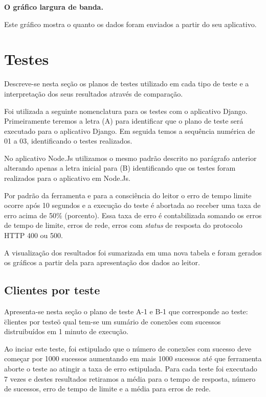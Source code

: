   \textbf{O gráfico largura de banda.}
  
  Este gráfico mostra o quanto os dados foram enviados a partir do seu aplicativo.


\section{Testes}

  Descreve-se nesta seção os planos de testes utilizado em cada tipo de teste e a interpretação dos seus resultados
  através de comparação.
  
  Foi utilizada a seguinte nomenclatura para os testes com o aplicativo Django. Primeiramente teremos a letra (A) para identificar
  que o plano de teste será executado para o aplicativo Django. Em seguida temos a sequência numérica de 01 a 03, 
  identificando o testes realizados. 
  
  No aplicativo Node.Js utilizamos o mesmo padrão descrito no parágrafo anterior alterando apenas a letra inicial para (B) identificando
  que os testes foram realizados para o aplicativo em Node.Js.
  
  Por padrão da ferramenta e para a consciência do leitor o erro de tempo limite ocorre após 10 segundos e a execução do teste é abortada
  ao receber uma taxa de erro acima de 50\% (porcento). Essa taxa de erro é contabilizada somando os erros de tempo de limite, erros de 
  rede, erros com \textit{status} de resposta do protocolo \ac{HTTP} 400 ou 500.
  
  A visualização dos resultados foi sumarizada em uma nova tabela e foram gerados os gráficos a partir dela para apresentação dos
  dados ao leitor.
  
\subsection{Clientes por teste}  

  
  Apresenta-se nesta seção o plano de teste A-1 e B-1 que corresponde ao teste: \"clientes por teste\" o qual tem-se um sumário
  de conexões com sucessos distruibuídos em 1 minuto de execução.
  
  Ao inciar este teste, foi estipulado que o número de conexões com sucesso deve começar por 1000 sucessos aumentando
  em mais 1000 sucessos até que ferramenta aborte o teste ao atingir a taxa de erro estipulada. Para cada teste
  foi executado 7 vezes e destes resultados retiramos a média para o tempo de resposta, número de sucessos, erro de tempo de limite 
  e a média para erros de rede.
  
